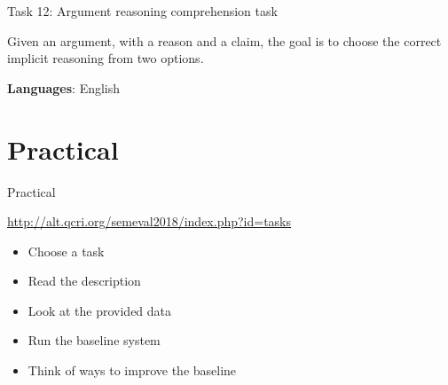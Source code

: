 \documentclass[10pt, compress]{beamer}
\begin{document}



\begin{frame}{Task 12: Argument reasoning comprehension task}

Given an argument, with a reason and a claim, the goal is to choose the correct implicit reasoning from two options.



\textbf{Languages}: English

\end{frame}




\section{Practical}

\begin{frame}{Practical}

\begin{center}
\url{http://alt.qcri.org/semeval2018/index.php?id=tasks}
\end{center}

\begin{itemize}
  \item Choose a task
  \item Read the description
  \item Look at the provided data
  \item Run the baseline system
  \item Think of ways to improve the baseline
\end{itemize}

\end{frame}
\end{document}
